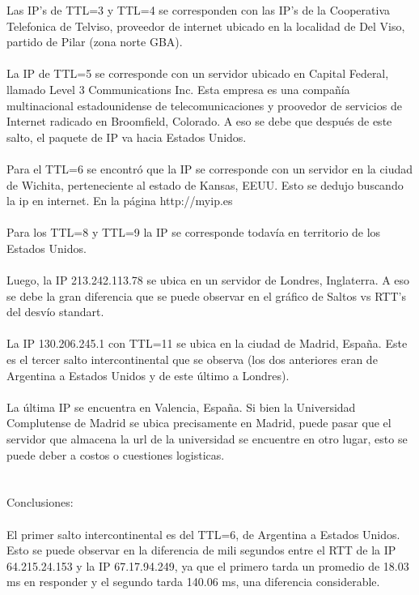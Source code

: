 Las IP's de TTL=3 y TTL=4 se corresponden con las IP's de la Cooperativa Telefonica de Telviso, proveedor de internet ubicado en 
la localidad de Del Viso, partido de Pilar (zona norte GBA). \\ \\

La IP de TTL=5 se corresponde con un servidor ubicado en Capital Federal, llamado Level 3 Communications Inc. Esta empresa es una 
compañía multinacional estadounidense de telecomunicaciones y proovedor de servicios de Internet radicado en Broomfield, Colorado. A eso se debe que  
después de este salto, el paquete de IP va hacia Estados Unidos.  \\ \\

Para el TTL=6 se encontró que la IP se corresponde con un servidor en la ciudad de Wichita, perteneciente al estado de Kansas, EEUU. 
Esto se dedujo buscando la ip en internet. En la página http://myip.es\\ \\

Para los TTL=8 y TTL=9 la IP se corresponde todavía en territorio de los Estados Unidos. \\ \\

Luego, la IP 213.242.113.78 se ubica en un servidor de Londres, Inglaterra. A eso se debe la gran diferencia que se puede observar en el 
gráfico de Saltos vs RTT's del desvío standart. \\ \\

La IP 130.206.245.1 con TTL=11 se ubica en la ciudad de Madrid, España. Este es el tercer salto intercontinental que se observa 
(los dos anteriores eran de Argentina a Estados Unidos y de este último a Londres). \\ \\

La última IP se encuentra en Valencia, España. Si bien la Universidad Complutense de Madrid se ubica precisamente en Madrid, 
puede pasar que el servidor que almacena la url de la universidad se encuentre en otro lugar, esto se puede deber a costos o cuestiones logisticas.\\ \\ \\


Conclusiones: \\ \\

El primer salto intercontinental es del TTL=6, de Argentina a Estados Unidos. Esto se puede observar en la diferencia de mili segundos entre 
el RTT de la IP 64.215.24.153 y la IP 67.17.94.249, ya que el primero tarda un promedio de 18.03 ms en responder y el segundo tarda 140.06 ms,
una diferencia considerable. \\ \\

